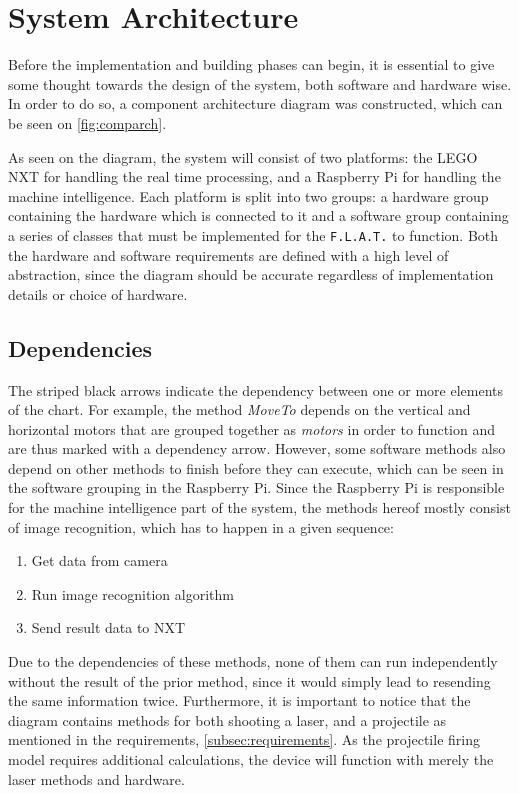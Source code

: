 \section{System Architecture}
\label{sec:architecture}
Before the implementation and building phases can begin, it is essential to give some thought towards the design of the system, both software and hardware wise.
In order to do so, a component architecture diagram was constructed, which can be seen on \autoref{fig:comparch}.


As seen on the diagram, the system will consist of two platforms: the LEGO NXT for handling the real time processing, and a Raspberry Pi for handling the machine intelligence.
Each platform is split into two groups: a hardware group containing the hardware which is connected to it and a software group containing a series of classes that must be implemented for the \texttt{F.L.A.T.} to function.
Both the hardware and software requirements are defined with a high level of abstraction, since the diagram should be accurate regardless of implementation details or choice of hardware.

\subsection*{Dependencies}
The striped black arrows indicate the dependency between one or more elements of the chart.
For example, the method \textit{MoveTo} depends on the vertical and horizontal motors that are grouped together as \textit{motors} in order to function and are thus marked with a dependency arrow.
However, some software methods also depend on other methods to finish before they can execute, which can be seen in the software grouping in the Raspberry Pi.
Since the Raspberry Pi is responsible for the machine intelligence part of the system, the methods hereof mostly consist of image recognition, which has to happen in a given sequence:
\begin{enumerate}
\item Get data from camera
\item Run image recognition algorithm
\item Send result data to NXT
\end{enumerate}

Due to the dependencies of these methods, none of them can run independently without the result of the prior method, since it would simply lead to resending the same information twice.
Furthermore, it is important to notice that the diagram contains methods for both shooting a laser, and a projectile as mentioned in the requirements, \autoref{subsec:requirements}.
As the projectile firing model requires additional calculations, the device will function with merely the laser methods and hardware. 

